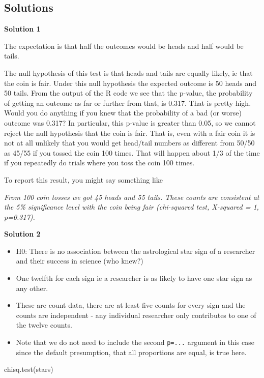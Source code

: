 \documentclass[
  letterpaper,
  DIV=11,
  numbers=noendperiod]{scrreprt}
\newenvironment{Shaded}{\begin{snugshade}}{\end{snugshade}}
\newcommand{\FunctionTok}[1]{\textcolor[rgb]{0.28,0.35,0.67}{#1}}
\newcommand{\NormalTok}[1]{\textcolor[rgb]{0.00,0.23,0.31}{#1}}
\providecommand{\tightlist}{%
  \setlength{\itemsep}{0pt}\setlength{\parskip}{0pt}}\usepackage{longtable,booktabs,array}
\begin{document}
\subsection{Solutions}\label{solutions}

\textbf{Solution 1}

The expectation is that half the outcomes would be heads and half would
be tails.

The null hypothesis of this test is that heads and tails are equally
likely, ie that the coin is fair. Under this null hypothesis the
expected outcome is 50 heads and 50 tails. From the output of the R code
we see that the p-value, the probability of getting an outcome as far or
further from that, is 0.317. That is pretty high. Would you do anything
if you knew that the probability of a bad (or worse) outcome was 0.317?
In particular, this p-value is greater than 0.05, so we cannot reject
the null hypothesis that the coin is fair. That is, even with a fair
coin it is not at all unlikely that you would get head/tail numbers as
different from 50/50 as 45/55 if you tossed the coin 100 times. That
will happen about 1/3 of the time if you repeatedly do trials where you
toss the coin 100 times.

To report this result, you might say something like

\emph{From 100 coin tosses we got 45 heads and 55 tails. These counts
are consistent at the 5\% significance level with the coin being fair
(chi-squared test, X-squared = 1, p=0.317).}

\textbf{Solution 2}

\begin{itemize}
\tightlist
\item
  H0: There is no association between the astrological star sign of a
  researcher and their success in science (who knew?)
\item
  One twelfth for each sign ie a researcher is as likely to have one
  star sign as any other.
\item
  These are count data, there are at least five counts for every sign
  and the counts are independent - any individual researcher only
  contributes to one of the twelve counts.
\item
  Note that we do not need to include the second \texttt{p=...} argument
  in this case since the default presumption, that all proportions are
  equal, is true here.
\end{itemize}

\begin{Shaded}
\begin{Highlighting}[]
\FunctionTok{chisq.test}\NormalTok{(stars)}
\end{Highlighting}
\end{Shaded}
\end{document}
